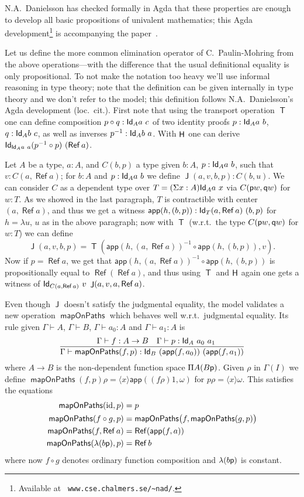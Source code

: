 \documentclass[10pt,a4paper]{article}
\DeclareMathOperator{\Ref}{\mathsf{Ref}}
\DeclareMathOperator{\Transp}{\mathsf{T}}
\DeclareMathOperator{\HH}{{\sf H}}
\DeclareMathOperator{\Jel}{\mathsf{J}}
\newcommand{\Id}{{\sf Id}}
\newcommand{\app}{\mathsf{app}}
\newcommand{\pp}{{\sf p}}
\newcommand{\qq}{{\sf q}}
\newcommand{\bind}[2]{{\langle}#1{\rangle}#2}
\DeclareMathOperator{\mapOnPaths}{\mathsf{mapOnPaths}}
\begin{document}
N.A.~Danielsson has checked formally in Agda that these properties are
enough to develop all basic propositions of univalent mathematics;
this Agda development\footnote{Available at {\tt
    www.cse.chalmers.se/\textasciitilde nad/}.} is accompanying the
paper~\cite{CoquandDanielsson}.

Let us define the more common elimination operator of C.\
Paulin-Mohring from the above operations---with the difference that
the usual definitional equality is only propositional.  To not make
the notation too heavy we'll use informal reasoning in type theory;
note that the definition can be given internally in type theory and we
don't refer to the model; this definition follows N.A.\ Danielsson's
Agda development (loc.\ cit.).  First note that using the transport
operation $\Transp$ one can define composition $p \circ q : \Id_A a~c$
of two identity proofs $p : \Id_A a~b$, $q : \Id_A b~c$, as well as
inverses $p^{-1} : \Id_A b~a$.  With $\HH$ one can derive $\Id_{\Id_A
  a~a} (p^{-1} \circ p)~(\Ref a)$.

Let $A$ be a type, $a : A$, and $C (b,p)$ a type given $b : A$, $p :
\Id_A a~b$, such that $v : C (a, \Ref a)$; for $b : A$ and $p :
\Id_{A} a~b$ we define $\Jel (a,v,b,p) : C (b,u)$.  We can consider
$C$ as a dependent type over $T = (\Sigma x : A) \Id_A a~x$ via $C
(\pp w, \qq w)$ for $w : T$.  As we showed in the last paragraph, $T$
is contractible with center $(a, \Ref a)$, and thus we get a witness
$\app (h, (b,p)) : \Id_T (a,\Ref a)~(b,p)$ for $h = \lambda u$, $u$ as
in the above paragraph; now with $\Transp$ (w.r.t.\ the type $C (\pp
w, \qq w)$ for $w : T$) we can define
\[
\Jel (a,v,b,p) = \Transp (\app (h, (a,\Ref a))^{-1} \circ \app
(h,(b,p)), v).
\]
Now if $p = \Ref a$, we get that $\app (h, (a,\Ref a))^{-1} \circ \app
(h,(b,p))$ is propositionally equal to $\Ref (\Ref a)$, and thus using
$\Transp$ and $\HH$ again one gets a witness of $\Id_{C (a, \Ref a)}~
v~\Jel (a,v,a,\Ref a)$.

Even though $\Jel$ doesn't satisfy the judgmental equality, the model
validates a new operation $\mapOnPaths$ which behaves well w.r.t.\
judgmental equality.  Its rule given $\Gamma \vdash A$, $\Gamma \vdash
B$, $\Gamma \vdash a_0 : A$ and $\Gamma \vdash a_1 : A$ is
\[
\frac {\quad \Gamma \vdash f : A \to B \quad \Gamma \vdash p :
  \Id_A~a_0~a_1} {\Gamma \vdash \mapOnPaths (f, p) : \Id_B~(\app
  (f,a_0))~(\app (f,a_1))}
\]
where $A \to B$ is the non-dependent function space $\Pi A (B \pp)$.
Given $\rho$ in $\Gamma (I)$ we define $\mapOnPaths (f, p) \rho =
\bind{x} \app ((f \rho) 1, \omega)$ for $p \rho = \bind x \omega$.
This satisfies the equations
\begin{align*}
  \mapOnPaths (\mathrm{id}, p) & = p \\
  \mapOnPaths (f \circ g, p) &= \mapOnPaths \bigl( f, \mapOnPaths
  (g, p) \bigr)\\
  \mapOnPaths (f, \Ref a) &= \Ref (\app (f, a))\\
  \mapOnPaths (\lambda (b \pp), p) &= \Ref b
\end{align*}
where now $f \circ g$ denotes ordinary function composition and
$\lambda (b \pp)$ is constant.
\end{document}
